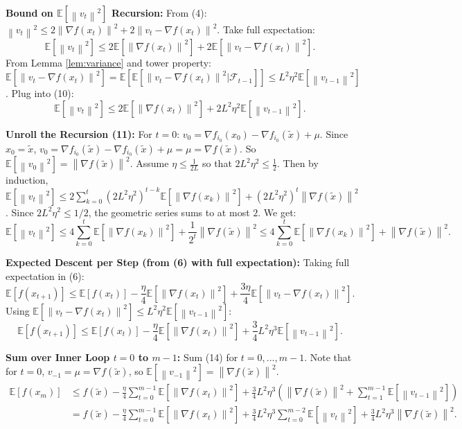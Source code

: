 \documentclass{article}
\newcommand{\E}{\mathbb{E}}
\newcommand{\norm}[1]{\left\| #1 \right\|}
\newcommand{\grad}{\nabla}
\newcommand{\step}[1]{\text{\color{blue}[Step #1]}}
\begin{document}
\step{13} \textbf{Bound on $\E[\norm{v_t}^2]$ Recursion:}
From (4): $\norm{v_t}^2 \le 2 \norm{\grad f(x_t)}^2 + 2 \norm{v_t - \grad f(x_t)}^2$.
Take full expectation:
\begin{equation}
    \E[\norm{v_t}^2] \le 2 \E[\norm{\grad f(x_t)}^2] + 2 \E[\norm{v_t - \grad f(x_t)}^2]. \tag{10}
\end{equation}
From Lemma \ref{lem:variance} and tower property:
$\E[\norm{v_t - \grad f(x_t)}^2] = \E[ \E[ \norm{v_t - \grad f(x_t)}^2 | \mathcal{F}_{t-1} ] ] \le L^2 \eta^2 \E[\norm{v_{t-1}}^2]$.
Plug into (10):
\begin{equation}
    \E[\norm{v_t}^2] \le 2 \E[\norm{\grad f(x_t)}^2] + 2 L^2 \eta^2 \E[\norm{v_{t-1}}^2]. \tag{11}
\end{equation}

\step{14} \textbf{Unroll the Recursion (11):}
For $t=0$: $v_0 = \grad f_{i_0}(x_0) - \grad f_{i_0}(\tilde{x}) + \mu$. Since $x_0 = \tilde{x}$, $v_0 = \grad f_{i_0}(\tilde{x}) - \grad f_{i_0}(\tilde{x}) + \mu = \mu = \grad f(\tilde{x})$. So $\E[\norm{v_0}^2] = \norm{\grad f(\tilde{x})}^2$.
Assume $\eta \le \frac{1}{2L}$ so that $2 L^2 \eta^2 \le \frac{1}{2}$.
Then by induction, $\E[\norm{v_t}^2] \le 2 \sum_{k=0}^t (2 L^2 \eta^2)^{t-k} \E[\norm{\grad f(x_k)}^2] + (2 L^2 \eta^2)^t \norm{\grad f(\tilde{x})}^2$.
Since $2 L^2 \eta^2 \le 1/2$, the geometric series sums to at most $2$. We get:
\begin{equation}
    \E[\norm{v_t}^2] \le 4 \sum_{k=0}^t \E[\norm{\grad f(x_k)}^2] + \frac{1}{2^t} \norm{\grad f(\tilde{x})}^2 \le 4 \sum_{k=0}^t \E[\norm{\grad f(x_k)}^2] + \norm{\grad f(\tilde{x})}^2. \tag{12}
\end{equation}

\step{15} \textbf{Expected Descent per Step (from (6) with full expectation):}
Taking full expectation in (6):
\begin{equation}
    \E[f(x_{t+1})] \le \E[f(x_t)] - \frac{\eta}{4} \E[\norm{\grad f(x_t)}^2] + \frac{3\eta}{4} \E[\norm{v_t - \grad f(x_t)}^2]. \tag{13}
\end{equation}
Using $\E[\norm{v_t - \grad f(x_t)}^2] \le L^2 \eta^2 \E[\norm{v_{t-1}}^2]$:
\begin{equation}
    \E[f(x_{t+1})] \le \E[f(x_t)] - \frac{\eta}{4} \E[\norm{\grad f(x_t)}^2] + \frac{3}{4} L^2 \eta^3 \E[\norm{v_{t-1}}^2]. \tag{14}
\end{equation}

\step{16} \textbf{Sum over Inner Loop $t=0$ to $m-1$:}
Sum (14) for $t=0,\dots,m-1$. Note that for $t=0$, $v_{-1} = \mu = \grad f(\tilde{x})$, so $\E[\norm{v_{-1}}^2] = \norm{\grad f(\tilde{x})}^2$.
\begin{align}
    \E[f(x_m)] &\le f(\tilde{x}) - \frac{\eta}{4} \sum_{t=0}^{m-1} \E[\norm{\grad f(x_t)}^2] + \frac{3}{4} L^2 \eta^3 \left( \norm{\grad f(\tilde{x})}^2 + \sum_{t=1}^{m-1} \E[\norm{v_{t-1}}^2] \right) \nonumber \\
    &= f(\tilde{x}) - \frac{\eta}{4} \sum_{t=0}^{m-1} \E[\norm{\grad f(x_t)}^2] + \frac{3}{4} L^2 \eta^3 \sum_{t=0}^{m-2} \E[\norm{v_t}^2] + \frac{3}{4} L^2 \eta^3 \norm{\grad f(\tilde{x})}^2. \tag{15}
\end{align}
\end{document}
